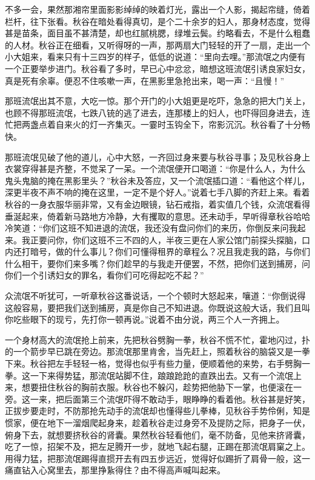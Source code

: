 \documentclass[12pt,UTF8]{ctexbook}
\begin{document}
{{{不多一会，果然那湘帘里面影影绰绰的映着灯光，露出一个人影，揭起帘缝，倚着栏杆，往下张看。秋谷在暗处看得真切，是个二十余岁的妇人，那身材态度，觉得甚是苗条，面目虽不甚清楚，却也红腻桃腮，绿堆云鬓。约略看去，不是什么粗蠢的人材。秋谷正在细看，又听得呀的一声，那两扇大门轻轻的开了一扇，走出一个小大姐来，看来只有十三四岁的样子，低低的说道：“里向去哩。”那流氓之内便有一个正要举步进门。秋谷看了多时，早已心中忿忿，暗想这班流氓引诱良家妇女，真是死有余辜。便忍不住咳嗽一声，在黑影里急抢出来，喝一声：“且慢！”

那班流氓出其不意，大吃一惊。那个开门的小大姐更是吃吓，急急的把大门关上，也顾不得那班流氓，七跌八铳的逃了进去，连那楼上的妇人，也吓得回身进去，连忙把两盏点着自来火的灯一齐集灭。一霎时玉钩全下，帘影沉沉。秋谷看了十分畅快。

那班流氓见破了他的道儿，心中大怒，一齐回过身来要与秋谷寻事；及见秋谷身上衣裳穿得甚是齐整，不觉呆了一呆。一个流氓便开口喝道：“你是什么人，为什么鬼头鬼脑的掩在黑影里头？”秋谷未及答应，又一个流氓插口道：“看他这个样儿，深更半夜不声不响的掩在这里，一定不是个好人。”说着七手八脚的齐赶上来。看着秋谷的一身衣服华丽非常，又有金边眼镜，钻石戒指，着实值几个钱，众流氓看得垂涎起来，倚着新马路地方冷静，大有攫取的意思。还未动手，早听得章秋谷哈哈冷笑道：“你们这班不知进退的流氓，我还没有盘问你们的来历，你倒反来问我起来。我正要问你，你们这班不三不四的人，半夜三更在人家公馆门前探头探脑，口内还打暗号，做的什么事儿？你们可懂得租界的章程么？况且我走我的路，与你们什么相干，要你们来多嘴？你们趁早的与我走开便罢，不然，把你们送到捕房，问你们一个引诱妇女的罪名，看你们可吃得起吃不起？”

众流氓不听犹可，一听章秋谷这番说话，一个个顿时大怒起来，嚷道：“你倒说得这般容易，要把我们送到捕房，真是你自己不知进退。你既说这般大话，我们且叫你吃些眼下的现亏，先打你一顿再说。”说着不由分说，两三个人一齐拥上。

一个身材高大的流氓抢上前来，先把秋谷劈胸一拳，秋谷不慌不忙，霍地闪过，扑的一个箭步早已跳在旁边。那流氓那里肯舍，当先赶上，照着秋谷的脑袋又是一拳下来。秋谷把左手轻轻一格，觉得也似乎有些力量，便顺着他的来势，右手劈胸一拳。这一下来得势猛，那流氓站脚不住，踉踉跄跄的直跌出去。又有一个流氓上来，想要扭住秋谷的胸前衣服。秋谷也不躲闪，趁势把他胁下一掌，也便滚在一旁。这一来，把后面第三个流氓吓得不敢动手，眼睁睁的看着他。秋谷甚是好笑，正拔步要走时，不防那抢先动手的流氓却也懂得些儿拳棒，见秋谷手势伶俐，知是惯家，便在地下一溜烟爬起身来，趁着秋谷走过身旁不及提防之际，把身子一伏，俯身下去，就想要挤秋谷的肾囊。果然秋谷轻看他们，毫不防备，见他来挤肾囊，吃了一惊，招架不及，把左足腾开一步，就地飞起右腿，正踢在那流氓肩窠之上。用得力猛，把那流氓踢得直掼开去有四五步远近，觉得好似踢折了肩骨一般，这一痛直钻入心窝里去，那里挣紥得住？由不得高声喊叫起来。

}}}
\end{document}

